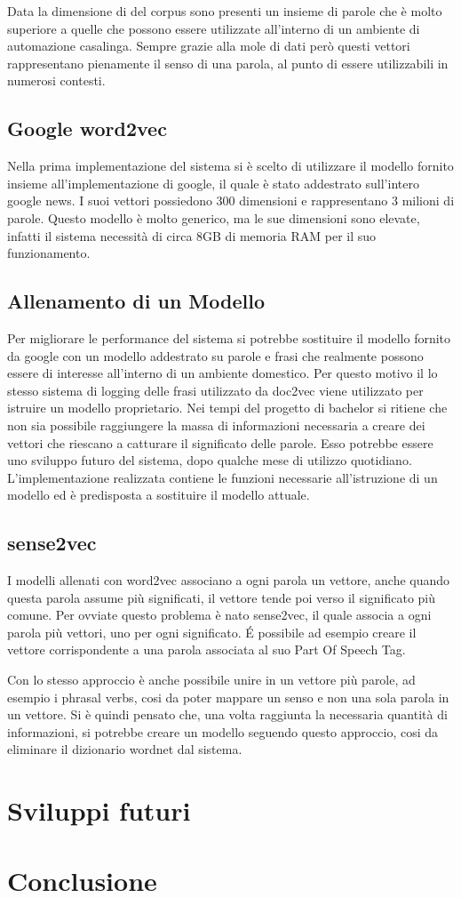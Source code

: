 \documentclass[twoside]{supsistudent}
\begin{document}
Data la dimensione di del corpus sono presenti un insieme di parole che è molto superiore a quelle che possono essere utilizzate all'interno di un ambiente di automazione casalinga. Sempre grazie alla mole di dati però questi vettori rappresentano pienamente il senso di una parola, al punto di essere utilizzabili in numerosi contesti.
\section{Google word2vec}
Nella prima implementazione del sistema si è scelto di utilizzare il modello fornito insieme all'implementazione di google, il quale è stato addestrato sull'intero google news. I suoi vettori possiedono 300 dimensioni e rappresentano 3 milioni di parole. Questo modello è molto generico, ma le sue dimensioni sono elevate, infatti il sistema necessità di circa 8GB di memoria RAM per il suo funzionamento.
\section{Allenamento di un Modello}
Per migliorare le performance del sistema si potrebbe sostituire il modello fornito da google con un modello addestrato su parole e frasi che realmente possono essere di interesse all'interno di un ambiente domestico. Per questo motivo il lo stesso sistema di logging delle frasi utilizzato da doc2vec viene utilizzato per istruire un modello proprietario. Nei tempi del progetto di bachelor si ritiene che non sia possibile raggiungere la massa di informazioni necessaria a creare dei vettori che riescano a catturare il significato delle parole. Esso potrebbe essere uno sviluppo futuro del sistema, dopo qualche mese di utilizzo quotidiano. L'implementazione realizzata contiene le funzioni necessarie all'istruzione di un modello ed è predisposta a sostituire il modello attuale.
\section{sense2vec}
I modelli allenati con word2vec associano a ogni parola un vettore, anche quando questa parola assume più significati, il vettore tende poi verso il significato più comune. Per ovviate questo problema è nato sense2vec, il quale associa a ogni parola più vettori, uno per ogni significato. É possibile ad esempio creare il vettore corrispondente a una parola associata al suo Part Of Speech Tag.  \cite{posCategories} \cite{sense2vec} 

Con lo stesso approccio è anche possibile unire in un vettore più parole, ad esempio i phrasal verbs, cosi da poter mappare un senso e non una sola parola in un vettore. Si è quindi pensato che, una volta raggiunta la necessaria quantità di informazioni, si potrebbe creare un modello seguendo questo approccio, cosi da eliminare il dizionario wordnet dal sistema.

\chapter{Sviluppi futuri}

\chapter{Conclusione}



\end{document}
